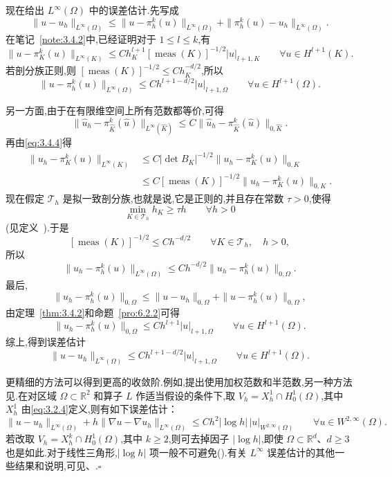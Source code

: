 \begin{note}
现在给出 \(L^\infty(\Omega)\) 中的误差估计.先写成
\[
  \|u-u_h\|_{L^\infty(\Omega)}
   \le\|u-\pi_h^k(u)\|_{L^\infty(\Omega)}
      +\|\pi_h^k(u)-u_h\|_{L^\infty(\Omega)}.
\]
在笔记~\ref{note:3.4.2}中,已经证明对于 \(1\le l\le k\),有
\[
  \|u-\pi_K^k(u)\|_{L^\infty(K)}
    \le Ch_K^{l+1}[\operatorname{meas}(K)]^{-1/2}|u|_{l+1,K}
      \qquad\forall u\in H^{l+1}(K).
\]
若剖分族正则,则 \([\operatorname{meas}(K)]^{-1/2}\le Ch_K^{-d/2}\),所以
\[
  \|u-\pi_h^k(u)\|_{L^\infty(\Omega)}
  \le Ch^{l+1-d/2}|u|_{l+1,\Omega}\qquad\forall u\in H^{l+1}(\Omega).
\]

另一方面,由于在有限维空间上所有范数都等价,可得
\[
  \|\widehat u_h-\pi_{\widehat K}^k(\widehat u)\|_{L^\infty(\widehat K)}
     \le C\|\widehat u_h-\pi_{\widehat K}^k(\widehat u)\|_{0,\widehat K}.
\]
再由\eqref{eq:3.4.4}得
\[
  \begin{aligned}
    \|u_h-\pi_K^k(u)\|_{L^\infty(K)}
      &\le C|\det B_K|^{-1/2}\|u_h-\pi_K^k(u)\|_{0,K}\\
      &\le C[\operatorname{meas}(K)]^{-1/2}\|u_h-\pi_K^k(u)\|_{0,K}.
  \end{aligned}
\]
现在假定 \(\mathcal T_h\) 是拟一致剖分族,也就是说,它是正则的,并且存在常数 \(\tau>0\),使得
\[
  \min_{K\in\mathcal T_h}h_K\ge\tau h\qquad\forall h>0
\]
(见定义~).于是
\[
  [\operatorname{meas}(K)]^{-1/2}\le Ch^{-d/2}
  \qquad\forall K\in\mathcal T_h,\quad h>0,
\]
所以
\[
  \|u_h-\pi_h^k(u)\|_{L^\infty(\Omega)}
   \le Ch^{-d/2}\|u_h-\pi_h^k(u)\|_{0,\Omega}.
\]
最后,
\[
  \|u_h-\pi_h^k(u)\|_{0,\Omega}\le
       \|u-u_h\|_{0,\Omega}+\|u-\pi_h^k(u)\|_{0,\Omega},
\]
由定理~\ref{thm:3.4.2}和命题~\ref{pro:6.2.2}可得
\[
  \|u_h-\pi_h^k(u)\|_{0,\Omega}
    \le Ch^{l+1}|u|_{l+1,\Omega}\qquad\forall u\in H^{l+1}(\Omega).
\]
综上,得到误差估计
\[
  \|u-u_h\|_{L^\infty(\Omega)}
   \le Ch^{l+1-d/2}|u|_{l+1,\Omega}\qquad\forall u\in H^{l+1}(\Omega).
\]

更精细的方法可以得到更高的收敛阶.例如,提出使用加权范数和半范数,另一种方法见.在对区域 \(\Omega\subset\mathbb R^2\) 和算子 \(L\) 作适当假设的条件下,取 \(V_h=X_h^1\cap H_0^1(\Omega)\),其中 \(X_h^1\) 由\eqref{eq:3.2.4}定义,则有如下误差估计：
\[
  \|u-u_h\|_{L^\infty(\Omega)}+h\|\nabla u-\nabla u_h\|_{L^\infty(\Omega)}
   \le Ch^2|\log h|\,|u|_{W^{2,\infty}(\Omega)}\qquad\forall u\in W^{2,\infty}(\Omega).
\]
若改取 \(V_h=X_h^k\cap H_0^1(\Omega)\),其中 \(k\ge2\),则可去掉因子 \(|\log h|\),即使 \(\Omega\subset\mathbb R^d\)、\(d\ge3\) 也是如此.对于线性三角形,\(|\log h|\) 项一般不可避免().有关 \(L^\infty\) 误差估计的其他一些结果和说明,可见、.\hfill\(\square\)
\end{note}

